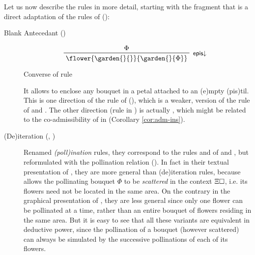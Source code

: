 Let us now describe the rules in more detail, starting with the fragment that is
a direct adaptation of the rules of  ():

\begin{description}
  \item[Blank Antecedant ()]
    
    \begin{marginfigure}
      $$
      \R[\rsf{epis{\da}}]
        {\Phi}
        {\flower{\garden{{}}{{}}}{\garden{{}}{\Phi}}}
      $$
      \caption{Converse of  rule}
    \end{marginfigure}

    It allows to enclose any bouquet in a petal attached to an \textsf{(e)}mpty
    \textsf{(pis)}til. This is one direction of the rule  of
    (), which is a weaker,  version
    of the  rule  of  and . The
    other direction (rule  in ) is
    actually , which might be related to the co-admissibility of
     in  (Corollary \ref{cor:adm-ins}).

  \item[(De)iteration (, )]
    Renamed \emph{\textsf{(poll)}ination} rules, they correspond to the rules
     and  of  and , but reformulated
    with the pollination relation (). In fact in their
    textual presentation of , they are more general than
    (de)iteration rules, because  allows the pollinating
    bouquet $\Phi$ to be \emph{scattered} in the context $\Xi\square$, i.e. its
    flowers need not be located in the same area. On the contrary in the
    graphical presentation of , they are less general
    since only one flower can be pollinated at a time, rather than an entire
    bouquet of flowers residing in the same area. But it is easy to see that all
    these variants are equivalent in deductive power, since the pollination of a
    bouquet (however scattered) can always be simulated by the successive
    pollinations of each of its flowers.


\end{description}
